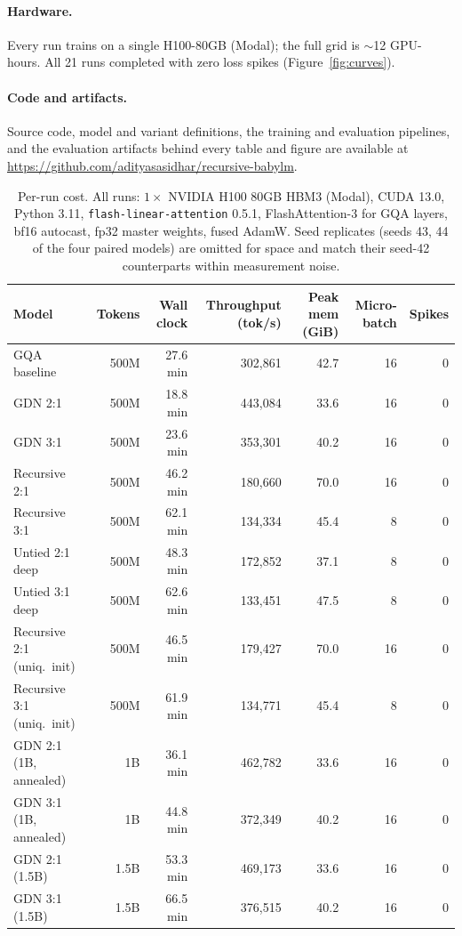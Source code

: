 \documentclass[11pt]{article}
\begin{document}
\paragraph{Hardware.} Every run trains on a single H100-80GB (Modal); the full grid is ${\sim}$12 GPU-hours. All 21 runs completed with zero loss spikes (Figure~\ref{fig:curves}).

\paragraph{Code and artifacts.} Source code, model and variant definitions, the training and evaluation pipelines, and the evaluation artifacts behind every table and figure are available at \url{https://github.com/adityasasidhar/recursive-babylm}.

\begin{table}[t]
\centering
\small
\begin{tabular}{lrrrrrr}
\toprule
Model & Tokens & Wall clock & Throughput (tok/s) & Peak mem (GiB) & Micro-batch & Spikes \\
\midrule
GQA baseline & 500M & 27.6 min & 302{,}861 & 42.7 & 16 & 0 \\
GDN 2:1 & 500M & 18.8 min & 443{,}084 & 33.6 & 16 & 0 \\
GDN 3:1 & 500M & 23.6 min & 353{,}301 & 40.2 & 16 & 0 \\
Recursive 2:1 & 500M & 46.2 min & 180{,}660 & 70.0 & 16 & 0 \\
Recursive 3:1 & 500M & 62.1 min & 134{,}334 & 45.4 & 8 & 0 \\
Untied 2:1 deep & 500M & 48.3 min & 172{,}852 & 37.1 & 8 & 0 \\
Untied 3:1 deep & 500M & 62.6 min & 133{,}451 & 47.5 & 8 & 0 \\
Recursive 2:1 (uniq.\ init) & 500M & 46.5 min & 179{,}427 & 70.0 & 16 & 0 \\
Recursive 3:1 (uniq.\ init) & 500M & 61.9 min & 134{,}771 & 45.4 & 8 & 0 \\
GDN 2:1 (1B, annealed) & 1B & 36.1 min & 462{,}782 & 33.6 & 16 & 0 \\
GDN 3:1 (1B, annealed) & 1B & 44.8 min & 372{,}349 & 40.2 & 16 & 0 \\
GDN 2:1 (1.5B) & 1.5B & 53.3 min & 469{,}173 & 33.6 & 16 & 0 \\
GDN 3:1 (1.5B) & 1.5B & 66.5 min & 376{,}515 & 40.2 & 16 & 0 \\
\bottomrule
\end{tabular}
\caption{Per-run cost. All runs: $1\times$ NVIDIA H100 80GB HBM3 (Modal), CUDA 13.0, Python 3.11, \texttt{flash-linear-attention} 0.5.1, FlashAttention-3 for GQA layers, bf16 autocast, fp32 master weights, fused AdamW. Seed replicates (seeds 43, 44 of the four paired models) are omitted for space and match their seed-42 counterparts within measurement noise.}
\label{tab:provenance}
\end{table}
\end{document}
